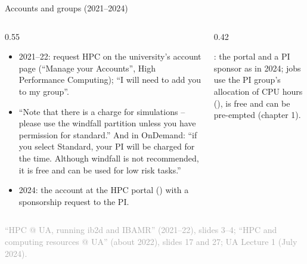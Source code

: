 \documentclass[aspectratio=169,11pt]{beamer}
\newcommand{\sourcecredit}[1]{\vfill\begin{flushright}\tiny\textcolor{DarkGray}{#1}\end{flushright}}
\begin{document}
\begin{frame}{Accounts and groups (2021--2024)}
\label{fr:uaaccount}
\begin{columns}[T,onlytextwidth]
\begin{column}{0.55\textwidth}
\footnotesize
\begin{itemize}\setlength{\itemsep}{2pt}
  \item 2021--22: request HPC on the university's account page (``Manage your Accounts'', High Performance Computing); ``I will need to add you to my group''.
  \item ``Note that there is a charge for simulations -- please use the windfall partition unless you have permission for standard.'' And in OnDemand: ``if you select Standard, your PI will be charged for the time. Although windfall is not recommended, it is free and can be used for low risk tasks.''
  \item 2024: the account at the HPC portal () with a sponsorship request to the PI.
\end{itemize}
\end{column}
\begin{column}{0.42\textwidth}
\begin{punchbox}
\small {}: the portal and a PI sponsor as in 2024;  jobs use the PI group's allocation of CPU hours (),  is free and can be pre-empted (chapter 1).
\end{punchbox}
\end{column}
\end{columns}
\sourcecredit{``HPC @ UA, running ib2d and IBAMR'' (2021--22), slides 3--4; ``HPC and computing resources @ UA'' (about 2022), slides 17 and 27; UA Lecture 1 (July 2024).}
\end{frame}
\end{document}
